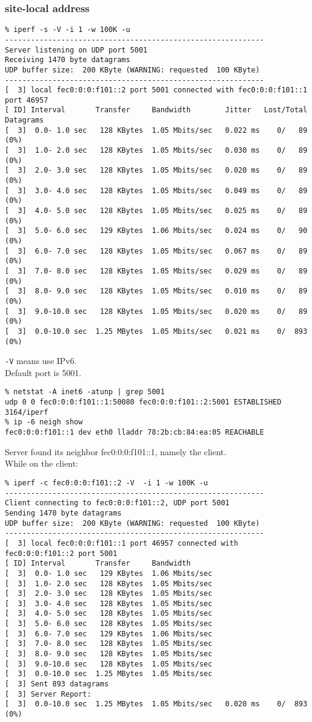 \documentclass[a4paper]{report}
\begin{document}
\subsubsection{site-local address}
\begin{lstlisting}
% iperf -s -V -i 1 -w 100K -u
------------------------------------------------------------
Server listening on UDP port 5001
Receiving 1470 byte datagrams
UDP buffer size:  200 KByte (WARNING: requested  100 KByte)
------------------------------------------------------------
[  3] local fec0:0:0:f101::2 port 5001 connected with fec0:0:0:f101::1 port 46957
[ ID] Interval       Transfer     Bandwidth        Jitter   Lost/Total Datagrams
[  3]  0.0- 1.0 sec   128 KBytes  1.05 Mbits/sec   0.022 ms    0/   89 (0%)
[  3]  1.0- 2.0 sec   128 KBytes  1.05 Mbits/sec   0.030 ms    0/   89 (0%)
[  3]  2.0- 3.0 sec   128 KBytes  1.05 Mbits/sec   0.020 ms    0/   89 (0%)
[  3]  3.0- 4.0 sec   128 KBytes  1.05 Mbits/sec   0.049 ms    0/   89 (0%)
[  3]  4.0- 5.0 sec   128 KBytes  1.05 Mbits/sec   0.025 ms    0/   89 (0%)
[  3]  5.0- 6.0 sec   129 KBytes  1.06 Mbits/sec   0.024 ms    0/   90 (0%)
[  3]  6.0- 7.0 sec   128 KBytes  1.05 Mbits/sec   0.067 ms    0/   89 (0%)
[  3]  7.0- 8.0 sec   128 KBytes  1.05 Mbits/sec   0.029 ms    0/   89 (0%)
[  3]  8.0- 9.0 sec   128 KBytes  1.05 Mbits/sec   0.010 ms    0/   89 (0%)
[  3]  9.0-10.0 sec   128 KBytes  1.05 Mbits/sec   0.020 ms    0/   89 (0%)
[  3]  0.0-10.0 sec  1.25 MBytes  1.05 Mbits/sec   0.021 ms    0/  893 (0%)
\end{lstlisting}
{\tt -V} means use IPv6.\\
Default port is 5001.
\begin{lstlisting}
% netstat -A inet6 -atunp | grep 5001
udp 0 0 fec0:0:0:f101::1:50080 fec0:0:0:f101::2:5001 ESTABLISHED 3164/iperf
% ip -6 neigh show
fec0:0:0:f101::1 dev eth0 lladdr 78:2b:cb:84:ea:05 REACHABLE
\end{lstlisting}
Server found its neighbor fec0:0:0:f101::1, namely the client.\\
While on the client:
\begin{lstlisting}
% iperf -c fec0:0:0:f101::2 -V  -i 1 -w 100K -u
------------------------------------------------------------
Client connecting to fec0:0:0:f101::2, UDP port 5001
Sending 1470 byte datagrams
UDP buffer size:  200 KByte (WARNING: requested  100 KByte)
------------------------------------------------------------
[  3] local fec0:0:0:f101::1 port 46957 connected with fec0:0:0:f101::2 port 5001
[ ID] Interval       Transfer     Bandwidth
[  3]  0.0- 1.0 sec   129 KBytes  1.06 Mbits/sec
[  3]  1.0- 2.0 sec   128 KBytes  1.05 Mbits/sec
[  3]  2.0- 3.0 sec   128 KBytes  1.05 Mbits/sec
[  3]  3.0- 4.0 sec   128 KBytes  1.05 Mbits/sec
[  3]  4.0- 5.0 sec   128 KBytes  1.05 Mbits/sec
[  3]  5.0- 6.0 sec   128 KBytes  1.05 Mbits/sec
[  3]  6.0- 7.0 sec   129 KBytes  1.06 Mbits/sec
[  3]  7.0- 8.0 sec   128 KBytes  1.05 Mbits/sec
[  3]  8.0- 9.0 sec   128 KBytes  1.05 Mbits/sec
[  3]  9.0-10.0 sec   128 KBytes  1.05 Mbits/sec
[  3]  0.0-10.0 sec  1.25 MBytes  1.05 Mbits/sec
[  3] Sent 893 datagrams
[  3] Server Report:
[  3]  0.0-10.0 sec  1.25 MBytes  1.05 Mbits/sec   0.020 ms    0/  893 (0%)
\end{lstlisting}
\end{document}
